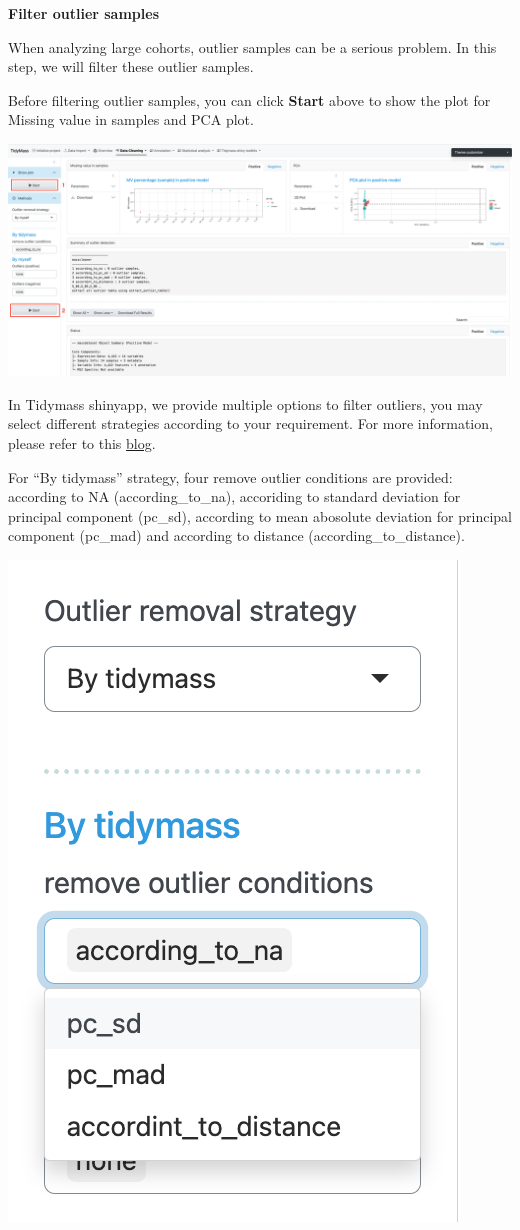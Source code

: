 \documentclass[
]{book}
\begin{document}
\textbf{Filter outlier samples}

When analyzing large cohorts, outlier samples can be a serious problem. In this step, we will filter these outlier samples.

Before filtering outlier samples, you can click \textbf{Start} above to show the plot for Missing value in samples and PCA plot.

\includegraphics{figures/outliers.png}

In Tidymass shinyapp, we provide multiple options to filter outliers, you may select different strategies according to your requirement. For more information, please refer to this \href{https://privefl.github.io/blog/detecting-outlier-samples-in-pca/}{blog}.

For ``By tidymass'' strategy, four remove outlier conditions are provided: according to NA (according\_to\_na), accoriding to standard deviation for principal component (pc\_sd), according to mean abosolute deviation for principal component (pc\_mad) and according to distance (according\_to\_distance).

\includegraphics{figures/outliers_tidymass.png}
\end{document}
